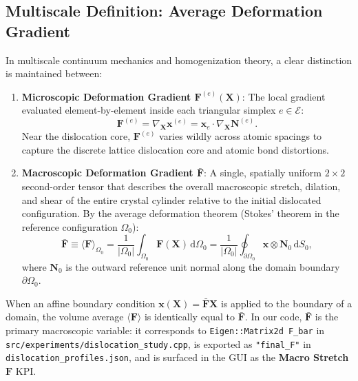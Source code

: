 \documentclass[11pt,a4paper]{article}
\begin{document}
\subsection{Multiscale Definition: Average Deformation Gradient}

In multiscale continuum mechanics and homogenization theory, a clear distinction is maintained between:
\begin{enumerate}
    \item \textbf{Microscopic Deformation Gradient $\mathbf{F}^{(e)}(\mathbf{X})$}:
    The local gradient evaluated element-by-element inside each triangular simplex $e \in \mathcal{E}$:
    \begin{equation}
    \mathbf{F}^{(e)} = \nabla_{\mathbf{X}} \mathbf{x}^{(e)} = \mathbf{x}_e \cdot \nabla_{\mathbf{X}} \mathbf{N}^{(e)}.
    \end{equation}
    Near the dislocation core, $\mathbf{F}^{(e)}$ varies wildly across atomic spacings to capture the discrete lattice dislocation core and atomic bond distortions.
    \item \textbf{Macroscopic Deformation Gradient $\bar{\mathbf{F}}$}:
    A single, spatially uniform $2 \times 2$ second-order tensor that describes the overall macroscopic stretch, dilation, and shear of the entire crystal cylinder relative to the initial dislocated configuration. By the average deformation theorem (Stokes' theorem in the reference configuration $\Omega_0$):
    \begin{equation}
    \label{eq:F_bar_def}
    \bar{\mathbf{F}} \equiv \langle \mathbf{F} \rangle_{\Omega_0} = \frac{1}{|\Omega_0|} \int_{\Omega_0} \mathbf{F}(\mathbf{X}) \, \mathrm{d}\Omega_0 = \frac{1}{|\Omega_0|} \oint_{\partial \Omega_0} \mathbf{x} \otimes \mathbf{N}_0 \, \mathrm{d}S_0,
    \end{equation}
    where $\mathbf{N}_0$ is the outward reference unit normal along the domain boundary $\partial \Omega_0$.
\end{enumerate}

When an affine boundary condition $\mathbf{x}(\mathbf{X}) = \bar{\mathbf{F}} \mathbf{X}$ is applied to the boundary of a domain, the volume average $\langle \mathbf{F} \rangle$ is identically equal to $\bar{\mathbf{F}}$. In our code, $\bar{\mathbf{F}}$ is the primary macroscopic variable: it corresponds to \texttt{Eigen::Matrix2d F\_bar} in \texttt{src/experiments/dislocation\_study.cpp}, is exported as \texttt{"final\_F"} in \texttt{dislocation\_profiles.json}, and is surfaced in the GUI as the \textbf{Macro Stretch $\mathbf{F}$} KPI.
\end{document}
